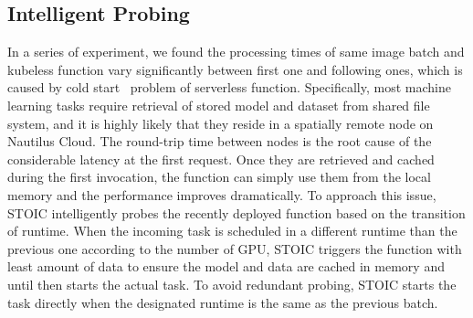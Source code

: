 \subsection{Intelligent Probing}
 In a series of experiment, we found the processing times of same image batch and kubeless function vary significantly between first one and following ones, which is caused by cold start~\cite{ref:coldstart} problem of serverless function. Specifically, most machine learning tasks require retrieval of stored model and dataset from shared file system, and it is highly likely that they reside in a spatially remote node on Nautilus Cloud. The round-trip time between nodes is the root cause of the considerable latency at the first request. Once they are retrieved and cached during the first invocation, the function can simply use them from the local memory and the performance improves dramatically. To approach this issue, STOIC intelligently probes the recently deployed function based on the transition of runtime. When the incoming task is scheduled in a different runtime than the previous one according to the number of GPU, STOIC triggers the function with least amount of data to ensure the model and data are cached in memory and until then starts the actual task. To avoid redundant probing,  STOIC starts the task directly when the designated runtime is the same as the previous batch.